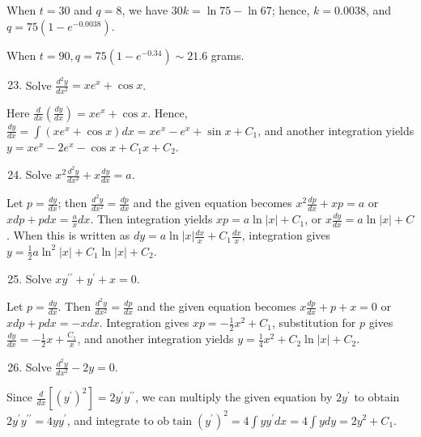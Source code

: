 \documentclass[10pt]{article}
\begin{document}
When $t=30$ and $q=8$, we have $30 k=\ln 75-\ln 67$; hence, $k=0.0038$, and $q=75\left(1-e^{-0.0038}\right)$.

When $t=90, q=75\left(1-e^{-0.34}\right) \sim 21.6$ grams.

\begin{enumerate}
  \setcounter{enumi}{22}
  \item Solve $\frac{d^{2} y}{d x^{2}}=x e^{x}+\cos x$.
\end{enumerate}

Here $\frac{d}{d x}\left(\frac{d y}{d x}\right)=x e^{x}+\cos x$. Hence, $\frac{d y}{d x}=\int\left(x e^{x}+\cos x\right) d x=x e^{x}-e^{x}+\sin x+C_{1}$, and another integration yields $y=x e^{x}-2 e^{x}-\cos x+C_{1} x+C_{2}$.

\begin{enumerate}
  \setcounter{enumi}{23}
  \item Solve $x^{2} \frac{d^{2} y}{d x^{2}}+x \frac{d y}{d x}=a$.
\end{enumerate}

Let $p=\frac{d y}{d x}$; then $\frac{d^{2} y}{d x^{2}}=\frac{d p}{d x}$ and the given equation becomes $x^{2} \frac{d p}{d x}+x p=a$ or $x d p+p d x=\frac{a}{x} d x$. Then integration yields $x p=a \ln |x|+C_{1}$, or $x \frac{d y}{d x}=a \ln |x|+C$. When this is written as $d y=a \ln |x| \frac{d x}{x}+C_{1} \frac{d x}{x}$, integration gives $y=\frac{1}{2} a \ln ^{2}|x|+C_{1} \ln |x|+C_{2}$.

\begin{enumerate}
  \setcounter{enumi}{24}
  \item Solve $x y^{\prime \prime}+y^{\prime}+x=0$.
\end{enumerate}

Let $p=\frac{d y}{d x}$. Then $\frac{d^{2} y}{d x^{2}}=\frac{d p}{d x}$ and the given equation becomes $x \frac{d p}{d x}+p+x=0$ or $x d p+p d x=-x d x$. Integration gives $x p=-\frac{1}{2} x^{2}+C_{1}$, substitution for $p$ gives $\frac{d y}{d x}=-\frac{1}{2} x+\frac{C_{1}}{x}$, and another integration yields $y=\frac{1}{4} x^{2}+C_{2} \ln |x|+C_{2}$.

\begin{enumerate}
  \setcounter{enumi}{25}
  \item Solve $\frac{d^{2} y}{d x^{2}}-2 y=0$.
\end{enumerate}

Since $\frac{d}{d x}\left[\left(y^{\prime}\right)^{2}\right]=2 y^{\prime} y^{\prime \prime}$, we can multiply the given equation by $2 y^{\prime}$ to obtain $2 y^{\prime} y^{\prime \prime}=4 y y^{\prime}$, and integrate to ob$\operatorname{tain}\left(y^{\prime}\right)^{2}=4 \int y y^{\prime} d x=4 \int y d y=2 y^{2}+C_{1}$.
\end{document}
